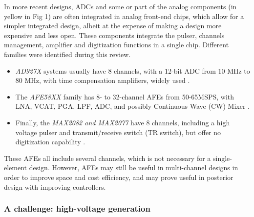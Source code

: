 \documentclass{article}
\begin{document}
In more recent designs, ADCs and some or part of the analog components (in yellow in Fig 1) are often integrated in analog front-end chips, which allow for a simpler integrated design, albeit at the expense of making a design more expensive and less open. These components integrate the pulser, channels management, amplifier and digitization functions in a single chip. Different families were identified during this review. 

\begin{itemize}
\item \emph{AD927X} systems usually have 8 channels, with a 12-bit ADC from 10 MHz to 80 MHz, with time compensation amplifiers, widely used \cite{di_ianni_system-level_2016,hewener_highly_2012,  raj_programmable_2018, cheung_multi-channel_2012, alqasemi_fpga-based_2012, batbayar_hardware_2018,  techavipoo_ultrasound_2012}. 
\item The \emph{AFE58XX} family has 8- to 32-channel AFEs from 50-65MSPS, with LNA, VCAT, PGA, LPF, ADC, and possibly Continuous Wave (CW) Mixer \cite{assef_flexible_2015, assef_design_2012, assef_compact_2014, assef_initial_2016, bharath_fpga-based_2015, bharath_novel_2016, lee_new_2014, hager_lightprobe:_2017, bharath_compact_2018, kidav_architecture_2019}.
\item Finally, the \emph{MAX2082 and MAX2077} have 8 channels, including a high voltage pulser and transmit/receive switch (TR switch), but offer no digitization capability \cite{hewener_mobile_2019, weng_fpga-based_2015}. 
\end{itemize}

These AFEs all include several channels, which is not necessary for a single-element design. However, AFEs may still be useful in multi-channel designs in order to improve space and cost efficiency, and may prove useful in posterior design with improving controllers.

\subsubsection{A challenge: high-voltage generation}
\end{document}
